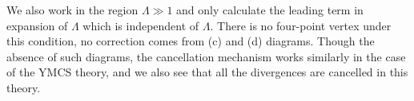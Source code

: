 \documentclass[a4paper,12pt]{article}
\begin{document}

We also work in the region $\Lambda \gg 1$
and only calculate the leading term
in expansion of $\Lambda$
which is independent of $\Lambda$.
%
%
There is no four-point vertex under this condition,
no correction comes from (c) and (d) diagrams.
%
Though the absence of such diagrams,
the cancellation mechanism works similarly in the case of the YMCS theory,
and we also see that all the divergences are cancelled in this theory.
%




\end{document}
